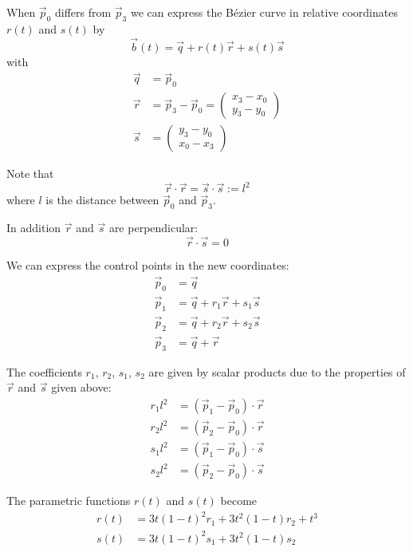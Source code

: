 \documentclass{article}
\begin{document}
When $\vec p_0$ differs from $\vec p_3$ we can express the B\'ezier
curve in relative coordinates $r(t)$ and $s(t)$ by
\begin{equation}
  \vec b(t) = \vec q + r(t)\vec r + s(t)\vec s
\end{equation}
with
\begin{align}
  \vec q & = \vec p_0\\
  \vec r & = \vec p_3 - \vec p_0 = \left(\begin{array}{c} x_3 - x_0 \\ y_3 - y_0 \end{array}\right)\\
  \vec s & = \left(\begin{array}{c} y_3 - y_0 \\ x_0 - x_3 \end{array}\right)
\end{align}

Note that
\begin{equation}
  \vec r\cdot\vec r = \vec s\cdot\vec s := l^2
\end{equation}
where $l$ is the distance between $\vec p_0$ and $\vec p_3$.

In addition $\vec r$ and $\vec s$ are perpendicular:
\begin{equation}
  \vec r\cdot\vec s = 0
\end{equation}

We can express the control points in the new coordinates:
\begin{align}
  \vec p_0 & = \vec q\\
  \vec p_1 & = \vec q + r_1\vec r + s_1\vec s\\
  \vec p_2 & = \vec q + r_2\vec r + s_2\vec s\\
  \vec p_3 & = \vec q + \vec r
\end{align}

The coefficients $r_1$, $r_2$, $s_1$, $s_2$ are given by scalar
products due to the properties of $\vec r$ and $\vec s$ given above:
\begin{align}
  r_1 l^2 & = (\vec p_1 - \vec p_0)\cdot\vec r\\
  r_2 l^2 & = (\vec p_2 - \vec p_0)\cdot\vec r\\
  s_1 l^2 & = (\vec p_1 - \vec p_0)\cdot\vec s\\
  s_2 l^2 & = (\vec p_2 - \vec p_0)\cdot\vec s
\end{align}

The parametric functions $r(t)$ and $s(t)$ become
\begin{align}
  r(t) & = 3t(1-t)^2 r_1 + 3t^2(1-t) r_2 + t^3\\
  s(t) & = 3t(1-t)^2 s_1 + 3t^2(1-t) s_2
\end{align}
\end{document}

